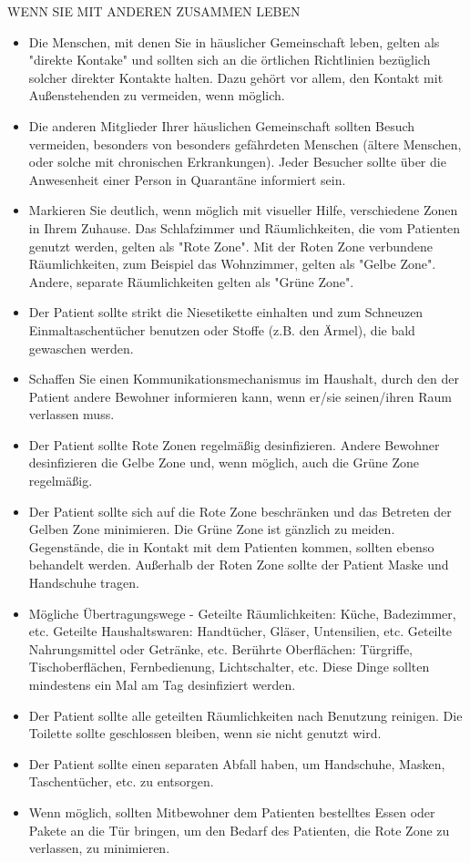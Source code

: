 \documentclass{article}
\begin{document}
\begin{center}WENN SIE MIT ANDEREN ZUSAMMEN LEBEN\end{center}
\begin{itemize}
\item Die Menschen, mit denen Sie in häuslicher Gemeinschaft leben, gelten als "direkte Kontake" und sollten sich an die örtlichen Richtlinien bezüglich solcher direkter Kontakte halten. Dazu gehört vor allem, den Kontakt mit Außenstehenden zu vermeiden, wenn möglich.
\item Die anderen Mitglieder Ihrer häuslichen Gemeinschaft sollten Besuch vermeiden, besonders von besonders gefährdeten Menschen (ältere Menschen, oder solche mit chronischen Erkrankungen). Jeder Besucher sollte über die Anwesenheit einer Person in Quarantäne informiert sein.
\item Markieren Sie deutlich, wenn möglich mit visueller Hilfe, verschiedene Zonen in Ihrem Zuhause. Das Schlafzimmer und Räumlichkeiten, die vom Patienten genutzt werden, gelten als "Rote Zone". Mit der Roten Zone verbundene Räumlichkeiten, zum Beispiel das Wohnzimmer, gelten als "Gelbe Zone". Andere, separate Räumlichkeiten gelten als "Grüne Zone".
\item Der Patient sollte strikt die Niesetikette einhalten und zum Schneuzen Einmaltaschentücher benutzen oder Stoffe (z.B. den Ärmel), die bald gewaschen werden.
\item Schaffen Sie einen Kommunikationsmechanismus im Haushalt, durch den der Patient andere Bewohner informieren kann, wenn er/sie seinen/ihren Raum verlassen muss.
\item Der Patient sollte Rote Zonen regelmäßig desinfizieren. Andere Bewohner desinfizieren die Gelbe Zone und, wenn möglich, auch die Grüne Zone regelmäßig.
\item Der Patient sollte sich auf die Rote Zone beschränken und das Betreten der Gelben Zone minimieren. Die Grüne Zone ist gänzlich zu meiden. Gegenstände, die in Kontakt mit dem Patienten kommen, sollten ebenso behandelt werden. Außerhalb der Roten Zone sollte der Patient Maske und Handschuhe tragen.
\item Mögliche Übertragungswege - Geteilte Räumlichkeiten: Küche, Badezimmer, etc. Geteilte Haushaltswaren: Handtücher, Gläser, Untensilien, etc. Geteilte Nahrungsmittel oder Getränke, etc. Berührte Oberflächen: Türgriffe, Tischoberflächen, Fernbedienung, Lichtschalter, etc. Diese Dinge sollten mindestens ein Mal am Tag desinfiziert werden.
\item Der Patient sollte alle geteilten Räumlichkeiten nach Benutzung reinigen. Die Toilette sollte geschlossen bleiben, wenn sie nicht genutzt wird.
\item Der Patient sollte einen separaten Abfall haben, um Handschuhe, Masken, Taschentücher, etc. zu entsorgen.
\item Wenn möglich, sollten Mitbewohner dem Patienten bestelltes Essen oder Pakete an die Tür bringen, um den Bedarf des Patienten, die Rote Zone zu verlassen, zu minimieren.
\end{itemize}
\end{document}
